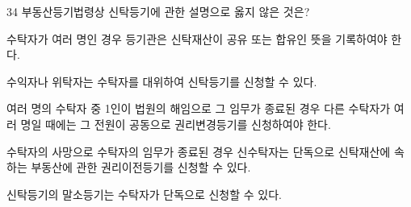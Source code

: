 \begin{question}{34}
부동산등기법령상 신탁등기에 관한 설명으로 옳지 않은 것은?
\begin{choices}
  \item 수탁자가 여러 명인 경우 등기관은 신탁재산이 공유 또는 합유인 뜻을 기록하여야 한다.
  \item 수익자나 위탁자는 수탁자를 대위하여 신탁등기를 신청할 수 있다.
  \item 여러 명의 수탁자 중 1인이 법원의 해임으로 그 임무가 종료된 경우 다른 수탁자가 여러 명일 때에는 그 전원이 공동으로 권리변경등기를 신청하여야 한다.
  \item 수탁자의 사망으로 수탁자의 임무가 종료된 경우 신수탁자는 단독으로 신탁재산에 속하는 부동산에 관한 권리이전등기를 신청할 수 있다.
  \item 신탁등기의 말소등기는 수탁자가 단독으로 신청할 수 있다.
\end{choices}
\end{question}

